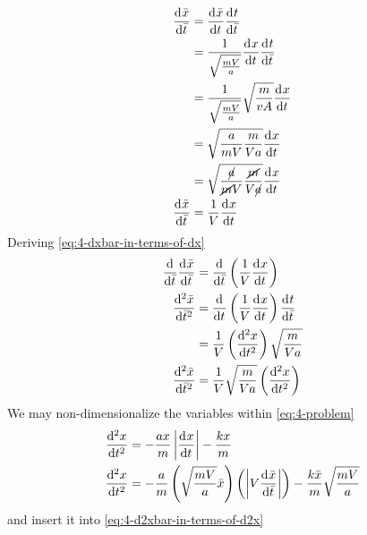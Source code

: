 \documentclass[12pt]{article}
\begin{document}
\begin{equation}
  \label{eq:4-dxbar-in-terms-of-dx}
  \begin{aligned}
    \od{\bar{x}}{\bar{t}} &= \od{\bar{x}}{t}\od{t}{\bar{t}} \\
    &= \frac{1}{\sqrt{\frac{mV}{a}}}\od{x}{t}\od{t}{\bar{t}} \\
    &= \frac{1}{\sqrt{\frac{mV}{a}}}\sqrt{\frac{m}{vA}}\od{x}{t} \\
    &= \sqrt{\frac{a}{mV}\frac{m}{Va}} \od{x}{t} \\
    &= \sqrt{\frac{\cancel{a}}{\cancel{m}V}\frac{\cancel{m}}{V\cancel{a}}}
    \od{x}{t} \\
    \od{\bar{x}}{\bar{t}} &= \frac{1}{V}\od{x}{t} \\
  \end{aligned}
\end{equation}
Deriving \cref{eq:4-dxbar-in-terms-of-dx}
\begin{equation}
  \label{eq:4-d2xbar-in-terms-of-d2x}
  \begin{aligned}
    \od{}{\bar{t}}\od{\bar{x}}{\bar{t}} &= \od{}{\bar{t}} \left(\frac{1}{V}\od{x}{t}\right) \\
    \od[2]{\bar{x}}{\bar{t}} &= \od{}{t}
    \left(\frac{1}{V}\od{x}{t}\right) \od{t}{\bar{t}} \\
    &= \frac{1}{V} \left(\od[2]{x}{t}\right) \sqrt{\frac{m}{Va}} \\
    \od[2]{\bar{x}}{\bar{t}} &= \frac{1}{V}\sqrt{\frac{m}{Va}} \left(\od[2]{x}{t}\right) \\
  \end{aligned}
\end{equation}
We may non-dimensionalize the variables within \cref{eq:4-problem}
\begin{equation}
  \label{eq:4-equation}
  \begin{aligned}
    \od[2]{x}{t} &= -\frac{ax}{m} \abs{\od{x}{t}} - \frac{kx}{m} \\
    \od[2]{x}{t} &= -\frac{a}{m}\left( \sqrt{\frac{mV}{a}}\bar{x}\right)
    \left( \abs{V\od{\bar{x}}{\bar{t}}}\right) -
    \frac{k\bar{x}}{m}\sqrt{\frac{mV}{a}} \\
  \end{aligned}
\end{equation}
and insert it into \cref{eq:4-d2xbar-in-terms-of-d2x}
\end{document}

